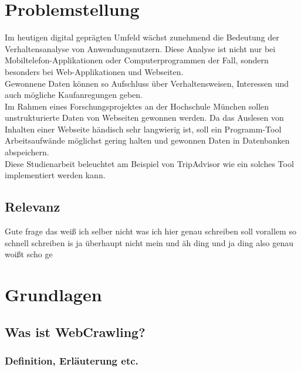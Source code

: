\documentclass[a4paper,oneside,12pt]{report}
\begin{document}
	


	\newpage
	\tableofcontents
	
	
	
	
	
	\chapter{Problemstellung}\label{probstellung}
	
		Im heutigen digital geprägten Umfeld wächst zunehmend die Bedeutung der Verhaltensanalyse von Anwendungsnutzern. Diese Analyse ist nicht nur bei Mobiltelefon-Applikationen oder Computerprogrammen der Fall, sondern besonders bei Web-Applikationen und Webseiten.
		\\
		Gewonnene Daten können so Aufschluss über Verhaltensweisen, Interessen und auch mögliche Kaufanregungen geben.
		\\
		Im Rahmen eines Forschungsprojektes an der Hochschule München sollen unstrukturierte Daten von Webseiten gewonnen werden. Da das Auslesen von Inhalten einer Webseite händisch sehr langwierig ist, soll ein Programm-Tool Arbeitsaufwände möglichst gering halten und gewonnen Daten in Datenbanken abspeichern.
		\\
		Diese Studienarbeit beleuchtet am Beispiel von TripAdvisor wie ein solches Tool implementiert werden kann.
	
		\section{Relevanz}
		
			Gute frage das weiß ich selber nicht was ich hier genau schreiben soll vorallem so schnell schreiben is ja überhaupt nicht mein und äh ding und ja ding also genau woißt scho ge
	
	

	\chapter{Grundlagen}\label{grlagen}
		
		\section{Was ist WebCrawling?}
		
			\subsection{Definition, Erläuterung etc.}
		
\end{document}
